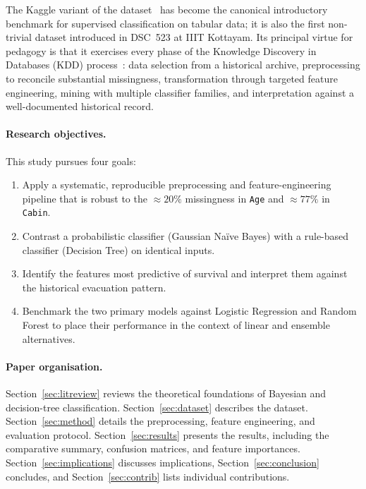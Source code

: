 \documentclass[10pt,a4paper,twocolumn]{article}
\begin{document}
The Kaggle variant of the dataset~\cite{kaggle_titanic} has become the canonical
introductory benchmark for supervised classification on tabular data; it is also the
first non-trivial dataset introduced in DSC~523 at IIIT Kottayam. Its principal virtue
for pedagogy is that it exercises every phase of the Knowledge Discovery in Databases
(KDD) process~\cite{han2011data}: data selection from a historical archive,
preprocessing to reconcile substantial missingness, transformation through targeted
feature engineering, mining with multiple classifier families, and interpretation against
a well-documented historical record.

\paragraph{Research objectives.} This study pursues four goals:
\begin{enumerate}
\itemsep-0.2em
  \item Apply a systematic, reproducible preprocessing and feature-engineering pipeline
  that is robust to the $\approx20\%$ missingness in \texttt{Age} and $\approx77\%$ in
  \texttt{Cabin}.
  \item Contrast a probabilistic classifier (Gaussian Na\"ive Bayes) with a rule-based
  classifier (Decision Tree) on identical inputs.
  \item Identify the features most predictive of survival and interpret them against the
  historical evacuation pattern.
  \item Benchmark the two primary models against Logistic Regression and Random Forest to
  place their performance in the context of linear and ensemble alternatives.
\end{enumerate}

\paragraph{Paper organisation.} Section~\ref{sec:litreview} reviews the theoretical
foundations of Bayesian and decision-tree classification. Section~\ref{sec:dataset}
describes the dataset. Section~\ref{sec:method} details the preprocessing, feature
engineering, and evaluation protocol. Section~\ref{sec:results} presents the results,
including the comparative summary, confusion matrices, and feature importances.
Section~\ref{sec:implications} discusses implications, Section~\ref{sec:conclusion}
concludes, and Section~\ref{sec:contrib} lists individual contributions.
\end{document}
